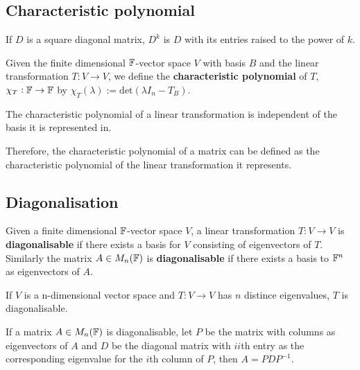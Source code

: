 \documentclass[../Year1/Year1.tex]{subfiles}
\begin{document}
\subsection{Characteristic polynomial}

\begin{theorem}
    If $D$ is a square diagonal matrix, $D^k$ is $D$ with its entries raised to the power of $k$.
\end{theorem}

\begin{definition}
    Given the finite dimensional $\mathbb{F}$-vector space $V$ with basis $B$ and the linear transformation $T:V\rightarrow V$, we define the \textbf{characteristic polynomial} of $T$, $\chi_T:\mathbb{F}\rightarrow\mathbb{F}$ by $\chi_T(\lambda):= \text{det}(\lambda I_n-T_B)$.
\end{definition}

\begin{theorem}
    The characteristic polynomial of a linear transformation is independent of the basis it is represented in.
\end{theorem}

\begin{remark}
    Therefore, the characteristic polynomial of a matrix can be defined as the characteristic polynomial of the linear transformation it represents.
\end{remark}

\subsection{Diagonalisation}
\begin{definition}[Diagonalisability]
    Given a finite dimensional $\mathbb{F}$-vector space $V$, a linear transformation $T:V\rightarrow V$ is \textbf{diagonalisable} if there exists a basis for $V$ consisting of eigenvectors of $T$. Similarly the matrix $A\in M_n(\mathbb{F})$ is \textbf{diagonalisable} if there exists a basis to $\mathbb{F}^n$ as eigenvectors of $A$.
\end{definition}

\begin{theorem}
    If $V$ is a n-dimensional vector space and $T:V\rightarrow V$ has $n$ distince eigenvalues, $T$ is diagonalisable.
\end{theorem}

\begin{theorem}
    If a matrix $A\in M_n(\mathbb{F})$ is diagonalisable,  let $P$ be the matrix with columns as eigenvectors of $A$ and $D$ be the diagonal matrix with $ii$th entry as the corresponding eigenvalue for the $i$th column of $P$, then $A=PDP^{-1}$.
\end{theorem}
\end{document}
